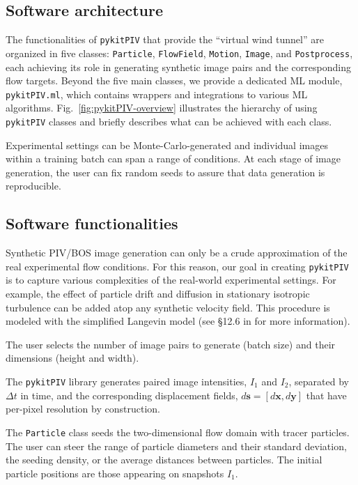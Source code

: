 \documentclass[a4paper,fleqn]{cas-dc}
\begin{document}
\subsection{Software architecture}

The functionalities of \texttt{pykitPIV} that provide the ``virtual wind tunnel'' are organized in five classes: \texttt{Particle}, \texttt{FlowField}, \texttt{Motion}, \texttt{Image}, and \texttt{Postprocess}, each achieving its role in generating synthetic image pairs and the corresponding flow targets. Beyond the five main classes, we provide a dedicated ML module, \texttt{pykitPIV.ml}, which contains wrappers and integrations to various ML algorithms. Fig.~\ref{fig:pykitPIV-overview} illustrates the hierarchy of using \texttt{pykitPIV} classes and briefly describes what can be achieved with each class. 

Experimental settings can be Monte-Carlo-generated and individual images within a training batch can span a range of conditions. At each stage of image generation, the user can fix random seeds to assure that data generation is reproducible. 

\subsection{Software functionalities}

Synthetic PIV/BOS image generation can only be a crude approximation of the real experimental flow conditions. For this reason, our goal in creating \texttt{pykitPIV} is to capture various complexities of the real-world experimental settings. For example, the effect of particle drift and diffusion in stationary isotropic turbulence can be added atop any synthetic velocity field. This procedure is modeled with the simplified Langevin model (see \S12.6 in \cite{pope2001turbulent} for more information).

The user selects the number of image pairs to generate (batch size) and their dimensions (height and width). 

The \texttt{pykitPIV} library generates paired image intensities, $I_1$ and $I_2$, separated by $\Delta t$ in time, and the corresponding displacement fields, $d\mathbf{s} = [d \mathbf{x}, d\mathbf{y}]$ that have per-pixel resolution by construction.

The \texttt{Particle} class seeds the two-dimensional flow domain with tracer particles. The user can steer the range of particle diameters and their standard deviation, the seeding density, or the average distances between particles. The initial particle positions are those appearing on snapshots $I_1$.
\end{document}
